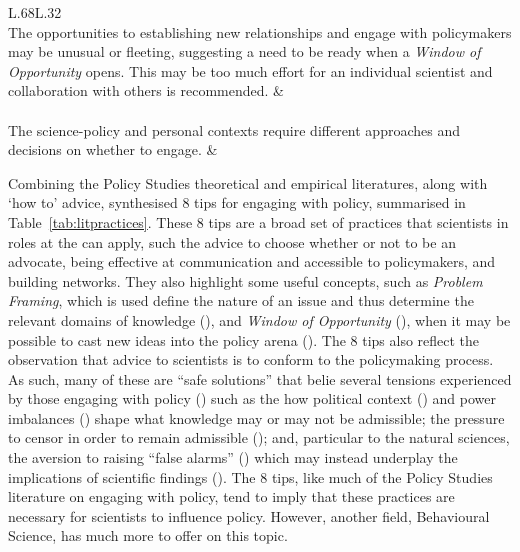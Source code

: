 \begin{table}[!ht]
\begin{tabular}{L{.68\linewidth}L{.32\linewidth}}
 \\
The opportunities to establishing new relationships and engage with policymakers may be unusual or fleeting, suggesting a need to be ready when a \emph{Window of Opportunity} opens. This may be too much effort for an individual scientist and collaboration with others is recommended.	 & 	\textcite{RoseBOP2018} \\ \hline
{} \\
The science-policy and personal contexts require different approaches and decisions on whether to engage. & 	\textcite{OjanenBKP2021,Obermeister2022} \\
\hline
\end{tabular}
\end{table}

Combining the Policy Studies theoretical and empirical literatures, along with `how to' advice, \textcite{OliverC2019} synthesised 8 tips for engaging with policy, summarised in Table~\ref{tab:litpractices}. These 8 tips are a broad set of practices that scientists in roles at the \SPI{} can apply, such the advice to choose whether or not to be an advocate, being effective at communication and accessible to policymakers, and building networks. They also highlight some useful concepts, such as \emph{Problem Framing}, which is used define the nature of an issue and thus determine the relevant domains of knowledge (\cite{OECD2015,MoallemiZHSMZHKHMGLB2023}), and \emph{Window of Opportunity} (\cite{Kingdon1993}), when it may be possible to cast new ideas into the policy arena (\cite{RoseBOP2018}). The 8 tips also reflect the observation that advice to scientists is to conform to the policymaking process. As such, many of these are ``safe solutions'' that belie several tensions experienced by those engaging with policy (\cite{CairneyO2020}) such as the how political context (\cite{SaxonbergSL2023,WesselinkH2020}) and power imbalances (\cite{TurnhoutMWKL2020,OjanenBKP2021,StrassheimK2014}) shape what knowledge may or may not be admissible; the pressure to censor in order to remain admissible (\cite{Pearce2024,OjanenBKP2021}); and, particular to the natural sciences, the aversion to raising ``false alarms'' (\cite{ReadO2017,PoeS2023}) which may instead underplay the implications of \CAN{} scientific findings (\cite{CalverleyA2022}). The 8 tips, like much of the Policy Studies literature on engaging with policy, tend to imply that these practices are necessary for scientists to influence policy. However, another field, Behavioural Science, has much more to offer on this topic.  

